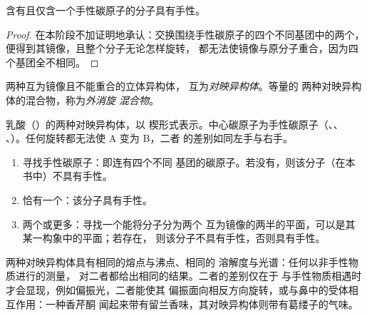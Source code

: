 \begin{proposition}[一个手性碳原子使分子具有手性]\label{prop:g12:stereochemistry:one-carbon}
含有且仅含一个手性碳原子的分子具有手性。
\end{proposition}

\begin{proof}
在本阶段不加证明地承认：交换围绕手性碳原子的四个不同基团中的两个，
便得到其镜像，且整个分子无论怎样旋转，
都无法使镜像与原分子重合，因为四个基团全不相同。
\end{proof}

\begin{definition}\label{def:g12:stereochemistry:enantiomer}
两种互为镜像且不能重合的立体异构体，
互为\emph{对映异构体}。等量的
两种对映异构体的混合物，称为\emph{外消旋
混合物}。
\end{definition}

\begin{omfigure}

{\small 乳酸（）的两种对映异构体，以
楔形式表示。中心碳原子为手性碳原子（、、
、）。任何旋转都无法使 A 变为 B，二者
的差别如同左手与右手。}
\end{omfigure}

\begin{method}[分子是否具有手性？]\label{met:g12:stereochemistry:chiral}
\begin{enumerate}
  \item 寻找手性碳原子：即连有四个不同
        基团的碳原子。若没有，则该分子（在本书中）不具有手性。
  \item 恰有一个：该分子具有手性。
  \item 两个或更多：寻找一个能将分子分为两个
        互为镜像的两半的平面，可以是其某一构象中的平面；若存在，
        则该分子不具有手性，否则具有手性。
\end{enumerate}
\end{method}

\begin{remark}\label{rem:g12:stereochemistry:same}
两种对映异构体具有相同的熔点与沸点、相同的
溶解度与光谱：任何以非手性物质进行的测量，
对二者都给出相同的结果。二者的差别仅在于
与手性物质相遇时才会显现，例如偏振光，二者能使其
偏振面向相反方向旋转，或与鼻中的受体相互作用：一种香芹酮
闻起来带有留兰香味，其对映异构体则带有葛缕子的气味。
\end{remark}

